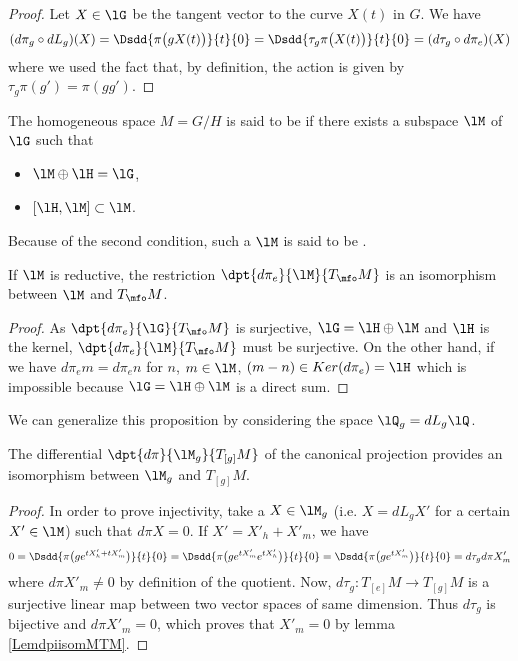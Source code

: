 \begin{proof}
	Let $X\in \lG$ be the tangent vector to the curve $X(t)$ in $G$. We have
	\begin{equation}
		(d\pi_g\circ dL_g)(X)=\Dsdd{ \pi\big( gX(t) \big) }{t}{0}=\Dsdd{ \tau_g\pi\big( X(t) \big) }{t}{0}=(d\tau_g\circ d\pi_e)(X)
	\end{equation}
	where we used the fact that, by definition, the action is given by $\tau_g\pi(g')=\pi(gg')$.
\end{proof}

\begin{definition}
	The homogeneous space $M=G/H$ is said to be  if there exists a subspace $\lM$ of $\lG$ such that
		\begin{itemize}
		\item $\lM\oplus\lH=\lG$,
		\item $[\lH,\lM]\subset\lM$.
	\end{itemize}
\end{definition}
Because of the second condition, such a $\lM$ is said to be .

\begin{lemma}		\label{LemdpiisomMTM}
If $\lM$ is reductive, the restriction $\dpt{d\pi_e}{\lM}{T_{\mfo}M}$ is an isomorphism between $\lM$ and $T_{\mfo}M$.
\end{lemma}
\begin{proof}
As $\dpt{d\pi_e}{\lG}{T_{\mfo}M}$ is surjective, $\lG=\lH\oplus\lM$ and $\lH$ is the kernel, $\dpt{d\pi_e}{\lM}{T_{\mfo}M}$ must be surjective. On the other hand, if we have $d\pi_em=d\pi_en$ for $n$, $m\in\lM$, $(m-n)\in Ker(d\pi_e)=\lH$ which is impossible because $\lG=\lH\oplus\lM$ is a direct sum.
\end{proof}

We can generalize this proposition by considering the space $\lQ_g=dL_g\lQ$. 
\begin{proposition} 		\label{PropDiffPiBijTgGH}\label{Cordpiietwii}
The differential $\dpt{d\pi}{\lM_g}{T_{[g]}M}$ of the canonical projection provides an isomorphism between $\lM_g$ and $T_{[g]}M$.
\end{proposition}

\begin{proof}
In order to prove injectivity, take a $X\in \lM_g$ (i.e. $X=dL_gX'$ for a certain $X'\in\lM$) such that $d\pi X=0$. If $X'=X'_h+X'_m$, we have
\[ 
0=\Dsdd{ \pi\big( g e^{tX'_h+tX'_m} \big) }{t}{0}
		=\Dsdd{ \pi\big( g e^{tX'_m} e^{tX'_h} \big) }{t}{0}
		=\Dsdd{ \pi\big( g e^{tX'_m} \big) }{t}{0}
		=d\tau_g d\pi X'_m
\]
where $d\pi X'_m\neq 0$ by definition of the quotient. Now, $d\tau_g\colon T_{[e]}M\to T_{[g]}M$ is a surjective linear map between two vector spaces of same dimension. Thus $d\tau_g$ is bijective and $d\pi X'_m=0$, which proves that $X'_m=0$ by lemma \ref{LemdpiisomMTM}.
\end{proof}

